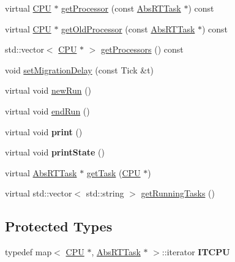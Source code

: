 \begin{DoxyCompactItemize}
\item 
virtual \hyperlink{classRTSim_1_1CPU}{C\+PU} $\ast$ \hyperlink{classRTSim_1_1MRTKernel_a465c7322be4b9ce5c4ef2594bd9e213a}{get\+Processor} (const \hyperlink{classRTSim_1_1AbsRTTask}{Abs\+R\+T\+Task} $\ast$) const 
\item 
virtual \hyperlink{classRTSim_1_1CPU}{C\+PU} $\ast$ \hyperlink{classRTSim_1_1MRTKernel_a132a1ad4926f4c91fdce20335e1312f3}{get\+Old\+Processor} (const \hyperlink{classRTSim_1_1AbsRTTask}{Abs\+R\+T\+Task} $\ast$) const 
\item 
std\+::vector$<$ \hyperlink{classRTSim_1_1CPU}{C\+PU} $\ast$ $>$ \hyperlink{classRTSim_1_1MRTKernel_a6c544578f9fe343193bc9fce190d21b1}{get\+Processors} () const 
\item 
void \hyperlink{classRTSim_1_1MRTKernel_a5f3d0c99ad98628bb6471a8b30b6fc0d}{set\+Migration\+Delay} (const Tick \&t)
\item 
virtual void \hyperlink{classRTSim_1_1MRTKernel_a19a55420054446e83b5b32954ab9be3b}{new\+Run} ()
\item 
virtual void \hyperlink{classRTSim_1_1MRTKernel_a79e1a32c34a15ed969eb3c9172fb4783}{end\+Run} ()
\item 
virtual void {\bfseries print} ()\hypertarget{classRTSim_1_1MRTKernel_a2e5cdecd40d6ba8e28115ffa13593064}{}\label{classRTSim_1_1MRTKernel_a2e5cdecd40d6ba8e28115ffa13593064}

\item 
virtual void {\bfseries print\+State} ()\hypertarget{classRTSim_1_1MRTKernel_a38270bbcbc8dfded9dc24299cd45c234}{}\label{classRTSim_1_1MRTKernel_a38270bbcbc8dfded9dc24299cd45c234}

\item 
virtual \hyperlink{classRTSim_1_1AbsRTTask}{Abs\+R\+T\+Task} $\ast$ \hyperlink{classRTSim_1_1MRTKernel_aed42ba73399b65a839a7a582a963f1c5}{get\+Task} (\hyperlink{classRTSim_1_1CPU}{C\+PU} $\ast$)
\item 
virtual std\+::vector$<$ std\+::string $>$ \hyperlink{classRTSim_1_1MRTKernel_ae591128d0e72f25fd28fc3267a50e767}{get\+Running\+Tasks} ()
\end{DoxyCompactItemize}
\subsection*{Protected Types}
\begin{DoxyCompactItemize}
\item 
typedef map$<$ \hyperlink{classRTSim_1_1CPU}{C\+PU} $\ast$, \hyperlink{classRTSim_1_1AbsRTTask}{Abs\+R\+T\+Task} $\ast$ $>$\+::iterator {\bfseries I\+T\+C\+PU}\hypertarget{classRTSim_1_1MRTKernel_a66872fb82ae1c27f03f0ab8301ae629e}{}\label{classRTSim_1_1MRTKernel_a66872fb82ae1c27f03f0ab8301ae629e}

\end{DoxyCompactItemize}
